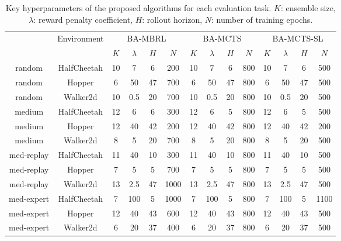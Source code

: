 \begin{table}[htbp]
\scriptsize
\centering
\begin{tabular}{|c|c|cccc|cccc|cccc|}
\hline
{\multirow{2}{*}{\makecell{Data Type}}} & \multirow{2}{*}{Environment} & \multicolumn{4}{c|}{BA-MBRL} & \multicolumn{4}{c|}{BA-MCTS} & \multicolumn{4}{c|}{BA-MCTS-SL} \\ \cline{3-14} & & $K$ & $\lambda$ & $H$ & $N$ & $K$ & $\lambda$ & $H$ & $N$ & $K$ & $\lambda$ & $H$ & $N$\\ 
\hline
{random} & {HalfCheetah} & {10} & {7} & {6} & {200} & {10} & {7} & {6} & {800} & {10} & {7} & {6} & {500}\\
{random} & {Hopper} & {6} & {50} & {47} & {700} & {6} & {50} & {47} & {800} & {6} & {50} & {47} & {500}\\
{random} & {Walker2d} & {10} & {0.5} & {20} & {700} & {10} & {0.5} & {20} & {800} & {10} & {0.5} & {20} & {500}\\
\hline
{medium} & {HalfCheetah} & {12} & {6} & {6} & {300} & {12} & {6} & {5} & {800} & {12} & {6} & {5} & {500}\\
{medium} & {Hopper} & {12} & {40} & {42} & {200} & {12} & {40} & {42} & {800} & {12} & {40} & {42} & {200}\\
{medium} & {Walker2d} & {8} & {5} & {20} & {700} & {8} & {5} & {20} & {800} & {8} & {5} & {20} & {500}\\
\hline 
{med-replay} & {HalfCheetah} & {11} & {40} & {10} & {300} & {11} & {40} & {10} & {800} & {11} & {40} & {10} & {500}\\
{med-replay} & {Hopper} & {7} & {5} & {5} & {700} & {7} & {5} & {5} & {800} & {7} & {5} & {5} & {500}\\
{med-replay} & {Walker2d} & {13} & {2.5} & {47} & {1000} & {13} & {2.5} & {47} & {800} & {13} & {2.5} & {47} & {500}\\
\hline 
{med-expert} & {HalfCheetah} & {7} & {100} & {5} & {1000} & {7} & {100} & {5} & {800} & {7} & {100} & {5} & {1100}\\
{med-expert} & {Hopper} & {12} & {40} & {43} & {600} & {12} & {40} & {43} & {800} & {12} & {40} & {43} & {500}\\
{med-expert} & {Walker2d} & {6} & {20} & {37} & {400} & {6} & {20} & {37} & {800} & {6} & {20} & {37} & {500}\\
\hline
\end{tabular}
\caption{Key hyperparameters of the proposed algorithms for each evaluation task. $K$: ensemble size, $\lambda$: reward penalty coefficient, $H$: rollout horizon, $N$: number of training epochs.}
\label{table:3}
\end{table}

